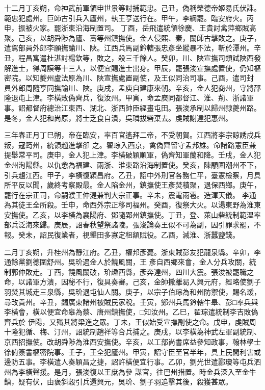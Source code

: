 \begin{pinyinscope}
 十二月丁亥朔，命神武前軍領申世景等討捕範忠。己丑，偽稱榮德帝姬易氏伏誅。範忠犯處州。巨師古引兵入廬州，執王亨送行在。甲午，李綱罷。臨安府火。丙申，振被火家。罷浙東沿海制置司。
 丁酉，岳飛遣統領徐慶、王貴討禽萍鄉賊高聚。己亥，以胡舜陟為廬、壽等州鎮撫使。金人侵熙、秦，關師古擊敗之。庚子，遣駕部員外郎李願撫諭川、陜。江西兵馬副鈐轄張忠彥坐縱暴不法，斬於潭州。辛丑，程昌寓遣杜湛討楊欽等，敗之，殺三千餘人。癸卯，川、陜宣撫司類試陜西發解進士，得周謨等十三人，以便宜賜進士出身。甲辰，罷張浚宣撫處置使，仍知樞密院。以知夔州盧法原為川、陜宣撫處置副使，及王似同治司事。己酉，遣司封
 員外郎周隨亨同撫諭川、陜。庚戌，孟庾自建康來朝。辛亥，金人犯商州，守將邵隆退屯上津。李橫敗偽齊兵，復汝州。甲寅，命孟庾同都督江、淮、荊、浙諸軍事。詔都督府總治江東西、湖北、浙西帥臣經畫屯田。張浚承制以歸州隸夔州路。是冬，金人犯和尚原，將士乏食自潰，吳璘拔砦棄去。虔賊謝達犯惠州。



 三年春正月丁巳朔，帝在臨安，率百官遙拜二帝，不受朝賀。江西將李宗諒誘戍兵叛，寇筠州，統領趙進擊卻
 之。翟琮入西京，禽偽齊留守孟邦雄。命諸路憲臣兼提舉常平司。庚申，金人犯上津。李橫破穎順軍，偽齊知軍蘭和降。壬戌，金人犯金州洵陽縣。以仇悆為福建、兩浙、淮東路沿海制置使。癸亥，陳顒圍潮州不下，引兵趨江西。甲子，李橫復穎昌府。乙丑，詔中外刑官各務仁平，臺憲檢察，月具所平反以聞，歲終考察殿最。金人陷金州，鎮撫使王彥焚積聚，退保西鄉。庚午，罷行在宗正司，命嗣濮王仲湜兼判大宗正事。辛未，震電雨雹。造渾天儀。
 李通為其徒王全所殺。壬申，命西外宗正移司福州。癸酉，復祭大火。以湯東野為淮東安撫使。乙亥，以李橫為襄陽府、鄧隨郢州鎮撫使。丁丑，登、萊山砦統制範溫率部兵泛海來歸。庚辰，詔春秋望祭諸陵。張浚論奏王似不可為副，因引罪求罷，不報。癸未，詔民復業者，視墾田多寡定租額賦役。乙酉，減淮、浙蠶鹽錢。



 二月丁亥朔，升桂州為靜江府。乙丑，權邦彥薨。浙東賊彭友犯龍泉縣。辛卯，李通餘黨劉德圍舒州。吳玠遇金人於饒風關，王
 彥自西鄉來會，金人分兵攻關，統制郭仲敗走。丁酉，饒風關破，玠趣西縣，彥奔達州，四川大震。張浚被罷職之命，以諸軍方潰，因秘不行，復具奏審。己亥，金帥撒離曷入興元府，經略使劉子羽焚其城走三泉縣，吳玠退屯仙人關。庚子，以宗子伯琮為和州防禦使，賜名瑗，尋改貴州。辛丑，蠲廣東諸州被賊民家稅。壬寅，鄭州兵馬鈐轄牛皋、彭□率兵與李橫會，橫以便宜命皋為蔡、唐州鎮撫使，□知汝州。乙巳，翟琮遣統制李吉敗偽齊兵於
 伊陽，又殲其將梁進之眾。丁未，王似始受宣撫副使之命。戊申，虔賊周十隆犯循、梅、汀州，詔統制趙祥等合兵捕之。庚戌，以李橫為神武左軍副統制、京西招撫使。改胡舜陟為淮西安撫使。辛亥，以工部尚書席益參知政事，翰林學士徐俯簽書樞密院事。壬子，王全犯廬州。甲寅，詔守臣至官半年，具上民間利害或邊防五事。李橫遣人奏穎昌之捷，詔許橫便宜行事。乙卯，劉光世遣酈瓊等屯兵泗州為李橫聲援。是月，張浚復以王庶為參
 謀官，往巴州措置。時金兵深入至金牛鎮，疑有伏，由褒斜穀引兵還興元，吳玠、劉子羽追擊其後，殺獲甚眾。




\end{pinyinscope}
